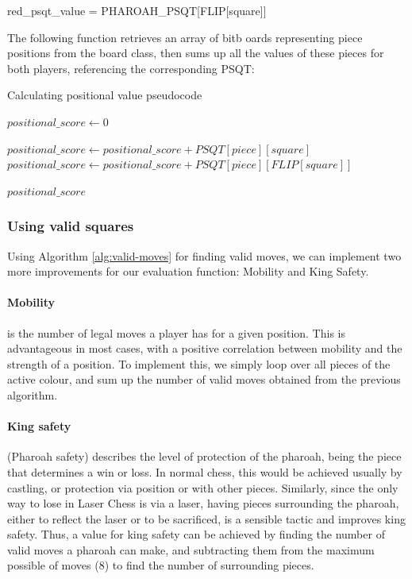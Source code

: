 \documentclass[../main/main.tex]{subfiles}
\begin{document}
\begin{center}
red\_psqt\_value = PHAROAH\_PSQT[FLIP[square]]
\end{center}

The following function retrieves an array of bitb oards representing piece positions from the board class, then sums up all the values of these pieces for both players, referencing the corresponding PSQT:

\begin{algorithm}[H]
\caption{Calculating positional value pseudocode}
\begin{algorithmic}
    \State $positional\_score \gets 0$

                    \State $positional\_score \gets positional\_score + PSQT[piece][square]$
                \Else
                    \State $positional\_score \gets positional\_score + PSQT[piece][FLIP[square]]$
                \EndIf
            \EndIf
        \EndFor
    \EndFor

    \State \Return $positional\_score$
    \EndFunction
\end{algorithmic}
\end{algorithm}

\subsubsection*{Using valid squares}
Using Algorithm \ref{alg:valid-moves} for finding valid moves, we can implement two more improvements for our evaluation function: Mobility and King Safety.

\paragraph{Mobility} is the number of legal moves a player has for a given position. This is advantageous in most cases, with a positive correlation between mobility and the strength of a position. To implement this, we simply loop over all pieces of the active colour, and sum up the number of valid moves obtained from the previous algorithm.

\paragraph{King safety} (Pharoah safety) describes the level of protection of the pharoah, being the piece that determines a win or loss. In normal chess, this would be achieved usually by castling, or protection via position or with other pieces. Similarly, since the only way to lose in Laser Chess is via a laser, having pieces surrounding the pharoah, either to reflect the laser or to be sacrificed, is a sensible tactic and improves king safety. Thus, a value for king safety can be achieved by finding the number of valid moves a pharoah can make, and subtracting them from the maximum possible of moves (8) to find the number of surrounding pieces.
\end{document}
